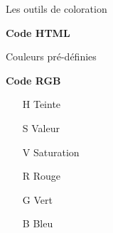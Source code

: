 \documentclass[10pt,svgnames,usenames,table]{beamer}
\begin{document}
\begin{frame}{Les outils de coloration}
	\begin{minipage}[t]{0.49\textwidth}
		\textbf{Code HTML}
	
		\vspace{0.2cm}
		Couleurs pré-définies
	
		\vspace{0.2cm}
	
		\begin{center}
		\end{center}
	
	\end{minipage}\hfill
	\begin{minipage}[t]{0.49\textwidth}
		\textbf{Code RGB}
	
		\begin{itemize}
			\item[H] Teinte
			\item[S] Valeur 
			\item[V] Saturation
			\item[R] Rouge
			\item[G] Vert 
			\item[B] Bleu
		\end{itemize}
	
	\end{minipage}
\end{frame}
\end{document}
